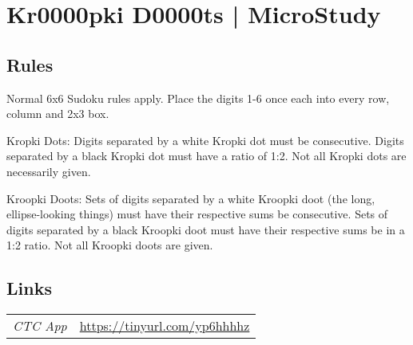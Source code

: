 \section{Kr0000pki D0000ts | {\normalfont MicroStudy}}
\label{sec:24-kr0000pki-d0000ts-microstudy}

\subsection*{Rules}
\begin{markdown}
Normal 6x6 Sudoku rules apply. Place the digits 1-6 once each into every row, column and 2x3 box.



Kropki Dots: Digits separated by a white Kropki dot must be consecutive. Digits separated by a black Kropki dot must have a ratio of 1:2. Not all Kropki dots are necessarily given.



Kroopki Doots: Sets of digits separated by a white Kroopki doot (the long, ellipse-looking things) must have their respective sums be consecutive. Sets of digits separated by a black Kroopki doot must have their respective sums be in a 1:2 ratio. Not all Kroopki doots are given.
\end{markdown}
\subsection*{Links}
\begin{tabularx}{\textwidth}{l X}
\emph{CTC App} & \url{https://tinyurl.com/yp6hhhhz} \\
\end{tabularx}
\pagebreak
